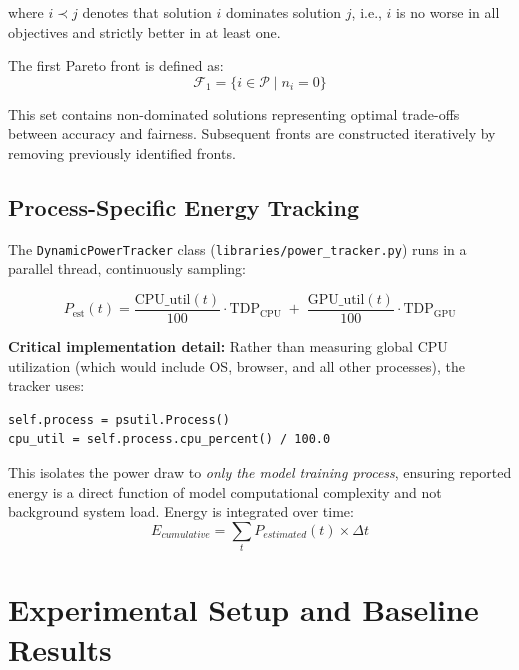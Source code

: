 \documentclass[12pt,a4paper]{article}
\begin{document}
where $i \prec j$ denotes that solution $i$ dominates solution $j$, i.e., $i$ is no worse in all objectives and strictly better in at least one.

The first Pareto front is defined as:
\begin{equation}
    \mathcal{F}_1 = \{i \in \mathcal{P} \mid n_i = 0\}
\end{equation}

This set contains non-dominated solutions representing optimal trade-offs between accuracy and fairness. Subsequent fronts are constructed iteratively by removing previously identified fronts.

\subsection{Process-Specific Energy Tracking}

The \texttt{DynamicPowerTracker} class (\texttt{libraries/power\_tracker.py}) runs in a parallel thread, continuously sampling:

\begin{equation}
    P_{\text{est}}(t) = 
    \frac{\text{CPU\_util}(t)}{100} \cdot \text{TDP}_{\text{CPU}} \;+\; 
    \frac{\text{GPU\_util}(t)}{100} \cdot \text{TDP}_{\text{GPU}}
\end{equation}

\textbf{Critical implementation detail:} Rather than measuring global CPU utilization (which would include OS, browser, and all other processes), the tracker uses:

\begin{verbatim}
self.process = psutil.Process()
cpu_util = self.process.cpu_percent() / 100.0
\end{verbatim}

This isolates the power draw to \textit{only the model training process}, ensuring reported energy is a direct function of model computational complexity and not background system load. Energy is integrated over time:
\begin{equation}
    E_{cumulative} = \sum_{t} P_{estimated}(t) \times \Delta t
\end{equation}

\section{Experimental Setup and Baseline Results}
\end{document}

